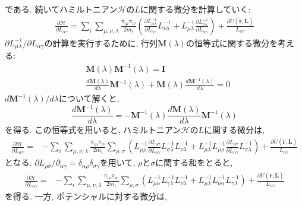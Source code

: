 である. 続いてハミルトニアン$\mathcal{H}$の$L$に関する微分を計算していく:
\begin{align}
  \frac{\partial \mathcal{H}}{\partial L_{\alpha\gamma}} =
  \sum_{i} \sum_{\mu,\nu,\lambda} \frac{\pi_{i\mu}\pi_{i\nu}}{2m_{i}}
  \left(
    \frac{\partial L_{\mu\lambda}^{-1}}{\partial L_{\alpha\gamma}} L_{\nu\lambda}^{-1} +
    L_{\mu\lambda}^{-1} \frac{\partial L_{\nu\lambda}^{-1}}{\partial L_{\alpha\gamma}}
  \right) +
  \frac{\partial U(\tilde{\bm{r}}, \bm{L})}{L_{\alpha\gamma}}
\end{align}
$\partial L_{\mu\lambda}^{-1}/\partial L_{\alpha\gamma}$の計算を実行するために, 行列$\bm{M}(\lambda)$の恒等式に関する微分を考える:
\begin{align}
  &\bm{M}(\lambda)\bm{M}^{-1}(\lambda) = \bm{I} \\
  &\frac{d\bm{M}(\lambda)}{d \lambda} \bm{M}^{-1}(\lambda) + \bm{M}(\lambda)\frac{d\bm{M}^{-1}(\lambda)}{d\lambda} = 0
\end{align}
$d\bm{M}^{-1}(\lambda)/d\lambda$について解くと, 
\begin{equation}
  \frac{d\bm{M}^{-1}(\lambda)}{d \lambda} = - \bm{M}^{-1}(\lambda)\frac{d\bm{M}(\lambda)}{d\lambda} \bm{M}^{-1}(\lambda)
\end{equation}
を得る. この恒等式を用いると, ハミルトニアン$\mathcal{H}$の$L$に関する微分は, 
\begin{align}
  \frac{\partial \mathcal{H}}{\partial L_{\alpha\gamma}} =&
  -\sum_{i} \sum_{\mu,\nu,\lambda} \frac{\pi_{i\mu}\pi_{i\nu}}{2m_{i}}
  \sum_{\rho,\sigma}
  \left(
    L_{\mu\rho}^{-1} \frac{\partial L_{\rho\sigma}}{\partial L_{\alpha\gamma}} L_{\sigma\lambda}^{-1} L_{\nu\lambda}^{-1} +
    L_{\mu\lambda}^{-1} L_{\mu\rho}^{-1} \frac{\partial L_{\rho\sigma}}{\partial L_{\alpha\gamma}} L_{\sigma\lambda}^{-1}
  \right) +
  \frac{\partial U(\tilde{\bm{r}}, \bm{L})}{L_{\alpha\gamma}}
\end{align}
となる. $\partial L_{\rho\sigma}/\partial_{\alpha\gamma} = \delta_{\alpha\rho}\delta_{\sigma\gamma}$を用いて, $\rho$と$\sigma$に関する和をとると,
\begin{align}
  \frac{\partial \mathcal{H}}{\partial L_{\alpha\gamma}} =&
  -\sum_{i} \sum_{\mu,\nu,\lambda} \frac{\pi_{i\mu}\pi_{i\nu}}{2m_{i}}
  \sum_{\rho,\sigma}
  \left(
    L_{\mu\alpha}^{-1} L_{\gamma\lambda}^{-1} L_{\nu\lambda}^{-1} +
    L_{\mu\lambda}^{-1} L_{\nu\alpha}^{-1} L_{\gamma\lambda}^{-1}
  \right) +
  \frac{\partial U(\tilde{\bm{r}}, \bm{L})}{L_{\alpha\gamma}}
\end{align}
を得る. 一方, ポテンシャルに対する微分は, 
